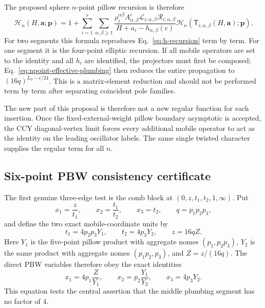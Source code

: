 \documentclass[11pt]{article}
\newcommand{\cH}{\mathcal H}
\begin{document}
The proposed sphere $n$-point pillow recursion is therefore
\begin{equation}
\boxed{
 \cH_n(H,\boldsymbol a;\boldsymbol p)
 =1+
 \sum_{i=1}^{r}\sum_{\alpha,\beta\geq1}
 \frac{\rho_i^{\alpha\beta}A_{\alpha,\beta}^{c}
       \mathcal L_{i;\alpha,\beta}\mathcal R_{i;\alpha,\beta}}
      {H+a_i-h_{\alpha,\beta}(c)}
 \cH_n\!\left(
 \mathsf T_{i;\alpha,\beta}(H,\boldsymbol a);\boldsymbol p\right).}
 \label{eq:npoint-h-recursion}
\end{equation}
For two segments this formula reproduces Eq.~\eqref{eq:h-recursion} term by
term.  For one segment
it is the four-point elliptic recursion.  If all mobile operators are set to
the identity and all $h_i$ are identified, the projectors must first be
composed; Eq.~\eqref{eq:npoint-effective-plumbing} then reduces the entire
propagation to $(16q)^{L_0-c/24}$.  This is a matrix-element reduction and
should not be performed term by term after separating coincident pole
families.

The new part of this proposal is therefore not a new regular function for
each insertion.  Once the fixed-external-weight pillow boundary asymptotic
is accepted, the CCY diagonal-vertex limit forces every additional mobile
operator to act as the identity on the leading oscillator labels.  The same
single twisted character supplies the regular term for all $n$.

\subsection{Six-point PBW consistency certificate}

The first genuine three-edge test is the comb block at
$(0,z,t_1,t_2,1,\infty)$.  Put
\begin{equation}
 x_1=\frac{z}{t_1},\qquad x_2=\frac{t_1}{t_2},\qquad x_3=t_2,
 \qquad q=p_1p_2p_3,
 \label{eq:sixpoint-ope-coordinates}
\end{equation}
and define the two exact mobile-coordinate units by
\begin{equation}
 t_1=4p_2p_3Y_1,\qquad t_2=4p_3Y_2,
 \qquad z=16qZ.
 \label{eq:sixpoint-mobile-units}
\end{equation}
Here $Y_1$ is the five-point pillow product with aggregate nomes
$(p_1,p_2p_3)$, $Y_2$ is the same product with aggregate nomes
$(p_1p_2,p_3)$, and $Z=z/(16q)$.  The direct PBW variables therefore obey
the exact identities
\begin{equation}
 \boxed{
 x_1=4p_1\frac{Z}{Y_1},\qquad
 x_2=p_2\frac{Y_1}{Y_2},\qquad
 x_3=4p_3Y_2.}
 \label{eq:sixpoint-exact-variable-map}
\end{equation}
This equation tests the central assertion that the middle plumbing segment
has no factor of $4$.
\end{document}

